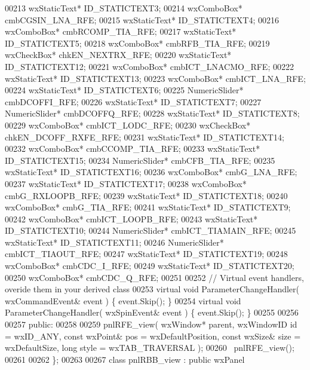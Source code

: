 \begin{DoxyCode}
00213         wxStaticText* ID_STATICTEXT3;
00214         wxComboBox* cmbCGSIN_LNA_RFE;
00215         wxStaticText* ID_STATICTEXT4;
00216         wxComboBox* cmbRCOMP_TIA_RFE;
00217         wxStaticText* ID_STATICTEXT5;
00218         wxComboBox* cmbRFB_TIA_RFE;
00219         wxCheckBox* chkEN_NEXTRX_RFE;
00220         wxStaticText* ID_STATICTEXT12;
00221         wxComboBox* cmbICT_LNACMO_RFE;
00222         wxStaticText* ID_STATICTEXT13;
00223         wxComboBox* cmbICT_LNA_RFE;
00224         wxStaticText* ID_STATICTEXT6;
00225         NumericSlider* cmbDCOFFI_RFE;
00226         wxStaticText* ID_STATICTEXT7;
00227         NumericSlider* cmbDCOFFQ_RFE;
00228         wxStaticText* ID_STATICTEXT8;
00229         wxComboBox* cmbICT_LODC_RFE;
00230         wxCheckBox* chkEN_DCOFF_RXFE_RFE;
00231         wxStaticText* ID_STATICTEXT14;
00232         wxComboBox* cmbCCOMP_TIA_RFE;
00233         wxStaticText* ID_STATICTEXT15;
00234         NumericSlider* cmbCFB_TIA_RFE;
00235         wxStaticText* ID_STATICTEXT16;
00236         wxComboBox* cmbG_LNA_RFE;
00237         wxStaticText* ID_STATICTEXT17;
00238         wxComboBox* cmbG_RXLOOPB_RFE;
00239         wxStaticText* ID_STATICTEXT18;
00240         wxComboBox* cmbG_TIA_RFE;
00241         wxStaticText* ID_STATICTEXT9;
00242         wxComboBox* cmbICT_LOOPB_RFE;
00243         wxStaticText* ID_STATICTEXT10;
00244         NumericSlider* cmbICT_TIAMAIN_RFE;
00245         wxStaticText* ID_STATICTEXT11;
00246         NumericSlider* cmbICT_TIAOUT_RFE;
00247         wxStaticText* ID_STATICTEXT19;
00248         wxComboBox* cmbCDC_I_RFE;
00249         wxStaticText* ID_STATICTEXT20;
00250         wxComboBox* cmbCDC_Q_RFE;
00251         
00252         \textcolor{comment}{// Virtual event handlers, overide them in your derived class}
00253         \textcolor{keyword}{virtual} \textcolor{keywordtype}{void} ParameterChangeHandler( wxCommandEvent& event ) \{ \textcolor{keyword}{event}.Skip(); \}
00254         \textcolor{keyword}{virtual} \textcolor{keywordtype}{void} ParameterChangeHandler( wxSpinEvent& event ) \{ \textcolor{keyword}{event}.Skip(); \}
00255         
00256     
00257     \textcolor{keyword}{public}:
00258         
00259         pnlRFE_view( wxWindow* parent, wxWindowID \textcolor{keywordtype}{id} = wxID\_ANY, \textcolor{keyword}{const} wxPoint& pos = wxDefaultPosition, \textcolor{keyword}{
      const} wxSize& size = wxDefaultSize, \textcolor{keywordtype}{long} style = wxTAB\_TRAVERSAL ); 
00260         ~pnlRFE_view();
00261     
00262 \};
00263 
00267 \textcolor{keyword}{class }pnlRBB_view : \textcolor{keyword}{public} wxPanel 

\end{DoxyCode}
